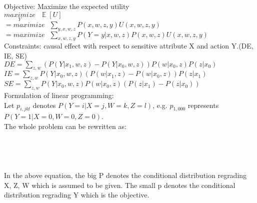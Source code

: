 \documentclass{article} %
\DeclareMathOperator{\E}{\mathbb{E}}
\begin{document}
\hspace*{1em}Objective: Maximize the expected utility\\
\hspace*{1.2em}$\underset{Y}{maximize}\,\,\,\, \E[U]$\\
$= {maximize}\,\,\,\,\sum\limits_{y, x, w, z} P(x, w, z, y)U(x, w, z, y)$\\
$= {maximize}\,\,\,\,\sum\limits_{x, w, z, y} P(Y=y|x, w, z)P(x, w, z)U(x, w, z, y)$\\
Constraints: causal effect with respect to sensitive attribute X and action Y.(DE, IE, SE)\\
\hspace*{5em}$DE =\sum\limits_{z, w}(P(Y|x_1, w, z)-P(Y|x_0, w, z))P(w|x_0, z)P(z|x_0)$\\
\hspace*{5em}$IE =\sum\limits_{z, w}P(Y|x_0, w, z)(P(w|x_1,z)-P(w|x_0, z))P(z|x_1)$\\
\hspace*{5em}$SE =\sum\limits_{z, w}P(Y|x_0, w, z)P(w|x_0, z)(P(z|x_1)-P(z|x_0))$\\
\hspace*{1em}Formulation of linear programming:\\
\hspace*{1em}Let $p_{i, jkl}$ denotes $P(Y=i |X=j, W=k, Z=l)$, e.g. $p_{1,000}$ represents $P(Y=1 |X=0, W=0, Z=0)$.\\
The whole problem can be rewritten as:\\
\\
\\
\\
\\
\hspace*{1em}In the above equation, the big P denotes the conditional distribution regrading X, Z, W which is assumed to be given. The small p denotes the conditional distribution regrading Y which is the objective.\\
\end{document}
